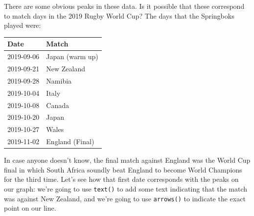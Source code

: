 \documentclass[
]{book}
\newenvironment{Shaded}{\begin{snugshade}}{\end{snugshade}}
\newcommand{\CharTok}[1]{\textcolor[rgb]{0.31,0.60,0.02}{#1}}
\newcommand{\CommentTok}[1]{\textcolor[rgb]{0.56,0.35,0.01}{\textit{#1}}}
\newcommand{\DataTypeTok}[1]{\textcolor[rgb]{0.13,0.29,0.53}{#1}}
\newcommand{\DecValTok}[1]{\textcolor[rgb]{0.00,0.00,0.81}{#1}}
\newcommand{\FloatTok}[1]{\textcolor[rgb]{0.00,0.00,0.81}{#1}}
\newcommand{\KeywordTok}[1]{\textcolor[rgb]{0.13,0.29,0.53}{\textbf{#1}}}
\newcommand{\NormalTok}[1]{#1}
\newcommand{\OperatorTok}[1]{\textcolor[rgb]{0.81,0.36,0.00}{\textbf{#1}}}
\newcommand{\StringTok}[1]{\textcolor[rgb]{0.31,0.60,0.02}{#1}}
\begin{document}
There are some obvious peaks in these data. Is it possible that these correspond to match days in the 2019 Rugby World Cup? The days that the Springboks played were:

\begin{longtable}[]{@{}ll@{}}
\toprule
Date & Match\tabularnewline
\midrule
\endhead
2019-09-06 & Japan (warm up)\tabularnewline
2019-09-21 & New Zealand\tabularnewline
2019-09-28 & Namibia\tabularnewline
2019-10-04 & Italy\tabularnewline
2019-10-08 & Canada\tabularnewline
2019-10-20 & Japan\tabularnewline
2019-10-27 & Wales\tabularnewline
2019-11-02 & England (Final)\tabularnewline
\bottomrule
\end{longtable}

In case anyone doesn't know, the final match against England was the World Cup final in which South Africa soundly beat England to become World Champions for the third time. Let's see how that first date corresponds with the peaks on our graph: we're going to use \texttt{text()} to add some text indicating that the match was against New Zealand, and we're going to use \texttt{arrows()} to indicate the exact point on our line.

\begin{Shaded}
\end{Shaded}
\end{document}

